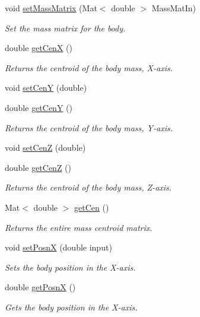 \begin{DoxyCompactItemize}
void \hyperlink{class_body_a0708419d1aa905bc7bd38c2a10c58272}{set\-Mass\-Matrix} (Mat$<$ double $>$ Mass\-Mat\-In)
\begin{DoxyCompactList}\small\item\em Set the mass matrix for the body. \end{DoxyCompactList}\item 
double \hyperlink{class_body_a7723a89d7d4b893a82dd693571a9449a}{get\-Cen\-X} ()
\begin{DoxyCompactList}\small\item\em Returns the centroid of the body mass, X-\/axis. \end{DoxyCompactList}\item 
void \hyperlink{class_body_abebc4472a354ea0d6307ccaff75714db}{set\-Cen\-Y} (double)
\item 
double \hyperlink{class_body_a5bafecfaa43dd1cf5deef6ada9d03858}{get\-Cen\-Y} ()
\begin{DoxyCompactList}\small\item\em Returns the centroid of the body mass, Y-\/axis. \end{DoxyCompactList}\item 
void \hyperlink{class_body_a866a9f5959854435e8efb688a3d09af7}{set\-Cen\-Z} (double)
\item 
double \hyperlink{class_body_aeab53e414035366be2094485ef72c3b7}{get\-Cen\-Z} ()
\begin{DoxyCompactList}\small\item\em Returns the centroid of the body mass, Z-\/axis. \end{DoxyCompactList}\item 
Mat$<$ double $>$ \hyperlink{class_body_a4e48c171b46972f1348fdf140876210e}{get\-Cen} ()
\begin{DoxyCompactList}\small\item\em Returns the entire mass centroid matrix. \end{DoxyCompactList}\item 
void \hyperlink{class_body_af507be7e52f44404e7664dd623585780}{set\-Posn\-X} (double input)
\begin{DoxyCompactList}\small\item\em Sets the body position in the X-\/axis. \end{DoxyCompactList}\item 
double \hyperlink{class_body_ad649f4405ae4b8e91f69e5e54ff68dcd}{get\-Posn\-X} ()
\begin{DoxyCompactList}\small\item\em Gets the body position in the X-\/axis. \end{DoxyCompactList}\item 

\end{DoxyCompactItemize}
